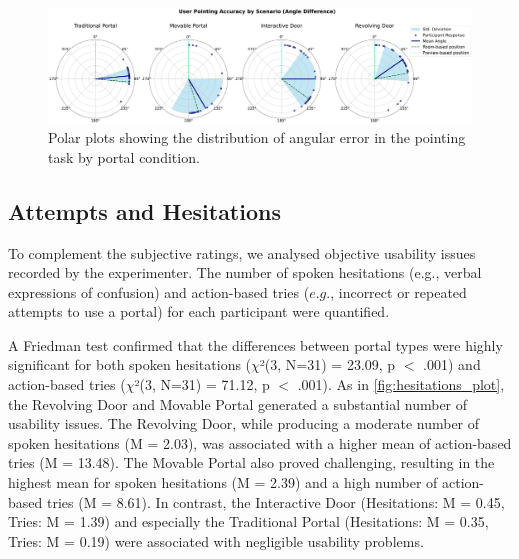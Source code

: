 \begin{figure}[t]
    \centering
    \includegraphics[width=\textwidth]{NOVAthesisFiles/Images/graphs/angle_difference_plot_with_stats.pdf}
    \caption[Polar plots of the distribution of angular error in the pointing task by portal condition.]
    {Polar plots showing the distribution of angular error in the pointing task by portal condition.}
    \label{fig:angle_plot}
\end{figure}

\subsection{Attempts and Hesitations}

To complement the subjective ratings, we analysed objective usability issues recorded by the experimenter. 
The number of spoken hesitations (e.g., verbal expressions of confusion) and action-based tries 
($e.g.$, incorrect or repeated attempts to use a portal) for each participant were quantified.

A Friedman test confirmed that the differences between portal types were highly significant for both spoken hesitations 
($\chi$²(3, N=31) = 23.09, p $<$ .001) and action-based tries ($\chi$²(3, N=31) = 71.12, p $<$ .001). As in \autoref{fig:hesitations_plot}, 
the Revolving Door and Movable Portal generated a substantial number of usability issues. The Revolving Door, while producing a moderate 
number of spoken hesitations (M = 2.03), was associated with a higher mean of action-based tries (M = 13.48). The Movable Portal also 
proved challenging, resulting in the highest mean for spoken hesitations (M = 2.39) and a high number of action-based tries (M = 8.61). 
In contrast, the Interactive Door (Hesitations: M = 0.45, Tries: M = 1.39) and especially the Traditional Portal (Hesitations: M = 0.35, 
Tries: M = 0.19) were associated with negligible usability problems.


